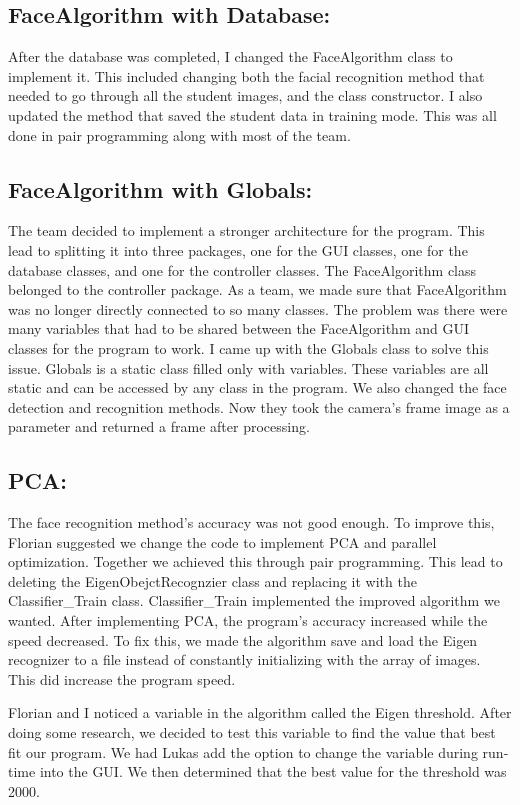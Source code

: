 \documentclass[12pt, a4paper]{article}
\begin{document}
\subsection{FaceAlgorithm with Database:}
After the database was completed, I changed the FaceAlgorithm class to implement it. This included changing both the facial recognition method that needed to go through all the student images, and the class constructor. I also updated the method that saved the student data in training mode. This was all done in pair programming along with most of the team.

\subsection{FaceAlgorithm with Globals:}
The team decided to implement a stronger architecture for the program. This lead to splitting it into three packages, one for the GUI classes, one for the database classes, and one for the controller classes. The FaceAlgorithm class belonged to the controller package. As a team, we made sure that FaceAlgorithm was no longer directly connected to so many classes. The problem was there were many variables that had to be shared between the FaceAlgorithm and GUI classes for the program to work. I came up with the Globals class to solve this issue. Globals is a static class filled only with variables. These variables are all static and can be accessed by any class in the program. We also changed the face detection and recognition methods. Now they took the camera’s frame image as a parameter and returned a frame after processing.

\subsection{PCA:}
The face recognition method’s accuracy was not good enough. To improve this, Florian suggested we change the code to implement PCA and parallel optimization. Together we achieved this through pair programming. This lead to deleting the EigenObejctRecognzier class and replacing it with the Classifier\_Train class. Classifier\_Train implemented the improved algorithm we wanted. After implementing PCA, the program’s accuracy increased while the speed decreased. To fix this, we made the algorithm save and load the Eigen recognizer to a file instead of constantly initializing with the array of images. This did increase the program speed.

Florian and I noticed a variable in the algorithm called the Eigen threshold. After doing some research, we decided to test this variable to find the value that best fit our program. We had Lukas add the option to change the variable during run-time into the GUI. We then determined that the best value for the threshold was 2000.
\end{document}
